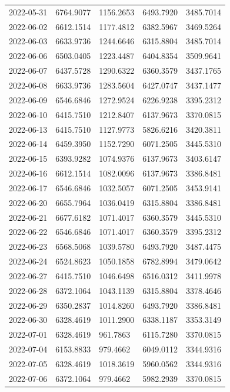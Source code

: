 {\begin{longtable}{lllll}
2022-05-31 & 6764.9077 & 1156.2653 & 6493.7920 & 3485.7014 \\
2022-06-02 & 6612.1514 & 1177.4812 & 6382.5967 & 3469.5264 \\
2022-06-03 & 6633.9736 & 1244.6646 & 6315.8804 & 3485.7014 \\
2022-06-06 & 6503.0405 & 1223.4487 & 6404.8354 & 3509.9641 \\
2022-06-07 & 6437.5728 & 1290.6322 & 6360.3579 & 3437.1765 \\
2022-06-08 & 6633.9736 & 1283.5604 & 6427.0747 & 3437.1477 \\
2022-06-09 & 6546.6846 & 1272.9524 & 6226.9238 & 3395.2312 \\
2022-06-10 & 6415.7510 & 1212.8407 & 6137.9673 & 3370.0815 \\
2022-06-13 & 6415.7510 & 1127.9773 & 5826.6216 & 3420.3811 \\
2022-06-14 & 6459.3950 & 1152.7290 & 6071.2505 & 3445.5310 \\
2022-06-15 & 6393.9282 & 1074.9376 & 6137.9673 & 3403.6147 \\
2022-06-16 & 6612.1514 & 1082.0096 & 6137.9673 & 3386.8481 \\
2022-06-17 & 6546.6846 & 1032.5057 & 6071.2505 & 3453.9141 \\
2022-06-20 & 6655.7964 & 1036.0419 & 6315.8804 & 3386.8481 \\
2022-06-21 & 6677.6182 & 1071.4017 & 6360.3579 & 3445.5310 \\
2022-06-22 & 6546.6846 & 1071.4017 & 6360.3579 & 3395.2312 \\
2022-06-23 & 6568.5068 & 1039.5780 & 6493.7920 & 3487.4475 \\
2022-06-24 & 6524.8623 & 1050.1858 & 6782.8994 & 3479.0642 \\
2022-06-27 & 6415.7510 & 1046.6498 & 6516.0312 & 3411.9978 \\
2022-06-28 & 6372.1064 & 1043.1139 & 6315.8804 & 3378.4646 \\
2022-06-29 & 6350.2837 & 1014.8260 & 6493.7920 & 3386.8481 \\
2022-06-30 & 6328.4619 & 1011.2900 & 6338.1187 & 3353.3149 \\
2022-07-01 & 6328.4619 & 961.7863 & 6115.7280 & 3370.0815 \\
2022-07-04 & 6153.8833 & 979.4662 & 6049.0112 & 3344.9316 \\
2022-07-05 & 6328.4619 & 1018.3619 & 5960.0562 & 3344.9316 \\
2022-07-06 & 6372.1064 & 979.4662 & 5982.2939 & 3370.0815 \\

\end{longtable}}
